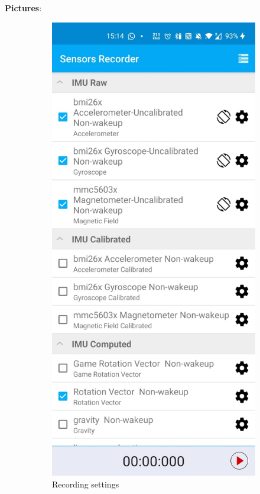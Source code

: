 \textbf{Pictures}:
\begin{figure}[H]
	\centering
	\begin{subfigure}[t]{.45\textwidth}
		\centering
		\includegraphics[width=0.6\linewidth]{images/recording_setting}
		\caption{Recording settings}
		\label{fig:recording_setting}
	\end{subfigure}
	\begin{subfigure}[t]{.45\textwidth}
		\centering

\end{subfigure}
\end{figure}
